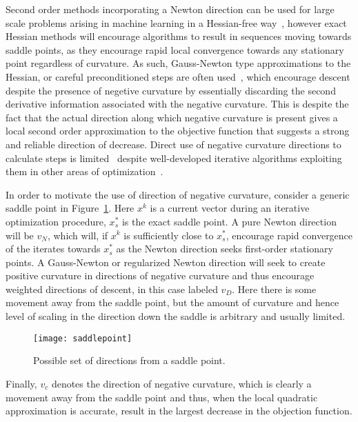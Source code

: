 \documentclass[psamsfonts,onesided,10pt]{amsart}
\theoremstyle{definition}
\theoremstyle{remark}
\numberwithin{equation}{section}
\begin{document}
Second order methods incorporating a Newton direction can be used for large scale problems
arising in machine learning in a Hessian-free way~\cite{martens2012training}, however exact Hessian methods will encourage
algorithms to result in sequences moving towards saddle points, as they encourage rapid local convergence towards
any stationary point regardless of curvature. As such, Gauss-Newton type approximations to the
Hessian, or careful preconditioned steps are often used~\cite{pascanu2013revisiting, chapelle2011improved, vinyals2011krylov}, 
which encourage descent despite the presence of negetive curvature by essentially discarding the second derivative information
associated with the negative curvature. This is despite the fact that the actual direction along which negative curvature
is present gives a local second order approximation to the objective function that suggests a strong and reliable direction
of decrease. Direct use of negative curvature directions to calculate steps is limited~\cite{mizutani2008second}
despite well-developed iterative algorithms exploiting them in other areas of optimization~\cite{fasano2007iterative}.
 

In order to motivate the use of direction of negative curvature, consider a generic saddle point in Figure~\ref{fig-saddle}. Here
$x^k$ is a current vector during an iterative optimization procedure, $x^*_s$ is the exact saddle point. A pure Newton direction will be
$v_N$, which will, if $x^k$ is sufficiently close to $x^*_s$, encourage rapid convergence of the iterates towards $x^*_s$ as the Newton
direction seeks first-order stationary points. A Gauss-Newton or regularized Newton direction will seek to create positive curvature in directions of negative curvature
and thus encourage weighted directions of descent, in this case labeled $v_D$. Here there is some movement away from the saddle point, but the
amount of curvature and hence level of scaling in the direction down the saddle is arbitrary and usually limited.
\begin{figure}
\begin{center}
\texttt{[image: saddlepoint]}
\end{center}
\caption{\label{fig-saddle} Possible set of directions from a saddle point.}
\end{figure}
Finally, $v_c$ denotes the direction of negative curvature, which is clearly a movement away from the saddle point and thus, when the local
quadratic approximation is accurate, result in the largest decrease in the objection function.
\end{document}
